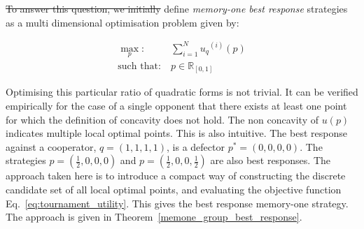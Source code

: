 \documentclass[10pt]{article}
\newcommand{\R}{\mathbb{R}}
\providecommand{\DIFaddtex}[1]{{\protect\color{blue}\uwave{#1}}} %
\providecommand{\DIFdeltex}[1]{{\protect\color{red}\sout{#1}}}                      %
\providecommand{\DIFaddbegin}{} %
\providecommand{\DIFaddend}{} %
\providecommand{\DIFdelend}{} %
\providecommand{\DIFadd}[1]{\texorpdfstring{\DIFaddtex{#1}}{#1}} %
\providecommand{\DIFdel}[1]{\texorpdfstring{\DIFdeltex{#1}}{}} %
\newcommand{\DIFaddincludegraphics}[2][]{{\color{blue}\fbox{\DIFOincludegraphics[#1]{#2}}}} %
\DeclareRobustCommand{\DIFaddbegin}{\DIFOaddbegin \let\includegraphics\DIFaddincludegraphics} %
\DeclareRobustCommand{\DIFaddend}{\DIFOaddend \let\includegraphics\DIFOincludegraphics} %
\DeclareRobustCommand{\DIFdelend}{\DIFOaddend \let\includegraphics\DIFOincludegraphics} %
\begin{document}
\DIFdel{To answer this question, we initially }\DIFdelend \DIFaddbegin \DIFadd{Here we }\DIFaddend define \textit{memory-one best response}
strategies as a multi dimensional optimisation problem given by:

\begin{equation}\label{eq:mo_tournament_optimisation}
    \begin{aligned}
    \max_p: & \ \sum_{i=1} ^ {N} {u_q}^{(i)} (p)
    \\
    \text{such that}: & \ p \in \R_{[0, 1]}
    \end{aligned}
\end{equation}

Optimising this particular ratio of quadratic forms is not trivial. It can be
verified empirically for the case of a single opponent that there exists at
least one point for which the definition of concavity does not hold.
The non concavity of \(u(p)\) indicates multiple local
optimal points. This is also intuitive. The best response against a cooperator,
\(q=(1, 1, 1, 1)\), is a defector \(p^*=(0, 0, 0, 0)\). The strategies
\(p=(\frac{1}{2}, 0, 0, 0)\) and \(p=(\frac{1}{2}, 0, 0, \frac{1}{2})\) are also
best responses. The approach taken here is to introduce a compact way of
constructing the discrete candidate set of all local optimal points, and evaluating
the objective function Eq.~\ref{eq:tournament_utility}. This gives the best
response memory-one strategy. The approach is given in
Theorem~\ref{memone_group_best_response}.
\end{document}
